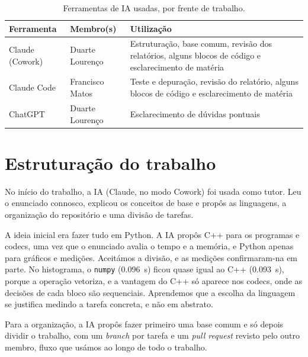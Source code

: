 \documentclass[a4paper,11pt]{article}
\newcommand{\prog}[1]{\texttt{#1}}
\begin{document}
\begin{table}[htbp]
\centering
\small
\begin{tabularx}{\linewidth}{l l X}
\toprule
Ferramenta & Membro(s) & Utilização \\
\midrule
Claude (Cowork) & Duarte Lourenço & Estruturação, base comum, revisão dos relatórios, alguns blocos de código e esclarecimento de matéria \\
Claude Code     & Francisco Matos & Teste e depuração, revisão do relatório, alguns blocos de código e esclarecimento de matéria \\
ChatGPT         & Duarte Lourenço & Esclarecimento de dúvidas pontuais \\
\bottomrule
\end{tabularx}
\caption{Ferramentas de IA usadas, por frente de trabalho.}
\label{tab:ferramentas}
\end{table}

\newpage
\section{Estruturação do trabalho}
\label{sec:estrutura}
No início do trabalho, a IA (Claude, no modo Cowork) foi usada como tutor. Leu o
enunciado connosco, explicou os conceitos de base e propôs as linguagens, a
organização do repositório e uma divisão de tarefas.

A ideia inicial era fazer tudo em Python. A IA propôs C++ para os programas e
codecs, uma vez que o enunciado avalia o tempo e a memória, e Python apenas para
gráficos e medições. Aceitámos a divisão, e as medições confirmaram-na em parte.
No histograma, o \prog{numpy} (\SI{0,096}{s}) ficou quase igual ao C++
(\SI{0,093}{s}), porque a operação vetoriza, e a vantagem do C++ só aparece nos
codecs, onde as decisões de cada bloco são sequenciais. Aprendemos que a escolha
da linguagem se justifica medindo a tarefa concreta, e não em abstrato.

Para a organização, a IA propôs fazer primeiro uma base comum e só depois
dividir o trabalho, com um \emph{branch} por tarefa e um \emph{pull request}
revisto pelo outro membro, fluxo que usámos ao longo de todo o trabalho.

\end{document}
